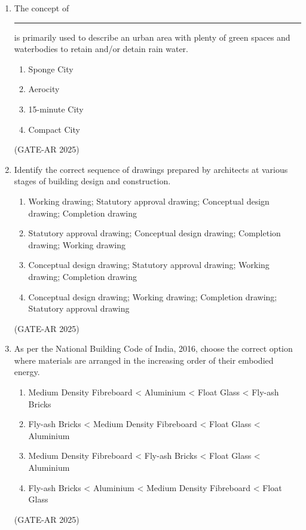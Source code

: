 \documentclass[a4paper,10pt]{article}
\begin{document}
\begin{enumerate}
    \item The concept of \rule{2cm}{0.4pt} is primarily used to describe an urban area with plenty of green spaces and waterbodies to retain and/or detain rain water.
    \begin{multicols}{4}
    \begin{enumerate}
        \item Sponge City
        \item Aerocity
        \item 15-minute City
        \item Compact City
    \end{enumerate}
    \end{multicols}
    \hfill (GATE-AR 2025)

    \item Identify the correct sequence of drawings prepared by architects at various stages of building design and construction.
    \begin{enumerate}
        \item Working drawing; Statutory approval drawing; Conceptual design drawing; Completion drawing
        \item Statutory approval drawing; Conceptual design drawing; Completion drawing; Working drawing
        \item Conceptual design drawing; Statutory approval drawing; Working drawing; Completion drawing
        \item Conceptual design drawing; Working drawing; Completion drawing; Statutory approval drawing
    \end{enumerate}
    \hfill (GATE-AR 2025)

    \item As per the National Building Code of India, 2016, choose the correct option where materials are arranged in the increasing order of their embodied energy.
    \begin{enumerate}
        \item Medium Density Fibreboard < Aluminium < Float Glass < Fly-ash Bricks
        \item Fly-ash Bricks < Medium Density Fibreboard < Float Glass < Aluminium
        \item Medium Density Fibreboard < Fly-ash Bricks < Float Glass < Aluminium
        \item Fly-ash Bricks < Aluminium < Medium Density Fibreboard < Float Glass
    \end{enumerate}
    \hfill (GATE-AR 2025)


\end{enumerate}
\end{document}
